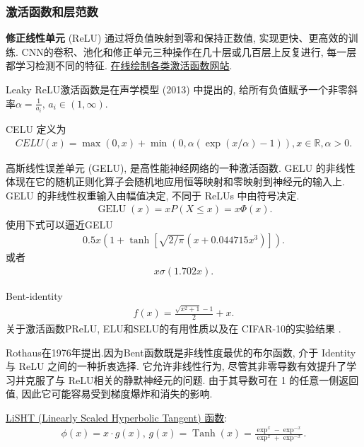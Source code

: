 \subsubsection{激活函数和层范数}
\textbf{修正线性单元} (ReLU) 通过将负值映射到零和保持正数值, 实现更快、更高效的训练.
CNN的卷积、池化和修正单元三种操作在几十层或几百层上反复进行, 每一层都学习检测不同的特征.
\href{https://dashee87.github.io/deep\%20learning/visualising-activation-functions-in-neural-networks/}{在线绘制各类激活函数网站}.
\begin{remark}
Leaky ReLU激活函数是在声学模型 (2013) 中提出的, 给所有负值赋予一个非零斜率$\alpha=\frac 1 {a_i},\, a_i\in (1,\infty)$.
\end{remark}
\begin{remark}
    CELU \cite{hendrycks2016gelu} 定义为
\begin{align}
    CELU (x)=\max (0,x)+\min (0,\alpha (\exp (x/\alpha)-1)), x\in \mathbb R, \alpha> 0.
\end{align}
\end{remark}
\begin{remark}
    高斯线性误差单元 (GELU), 是高性能神经网络的一种激活函数. GELU 的非线性体现在它的随机正则化算子会随机地应用恒等映射和零映射到神经元的输入上.
GELU 的非线性权重输入由幅值决定, 不同于 ReLUs 中由符号决定.
\begin{align}
    \operatorname{GELU} (x)=x P (X \leq x)=x \Phi (x).
\end{align}
使用下式可以逼近GELU
\begin{align}
    0.5 x\left (1+\tanh \left[\sqrt{2 / \pi}\left (x+0.044715 x^{3}\right)\right]\right).
\end{align}
或者
\begin{align}
    x \sigma (1.702 x).
\end{align}
\end{remark}

Bent-identity 
\begin{align}
    f (x) = \frac{\sqrt{x^2 + 1} - 1}{2} +x.
\end{align}
关于激活函数PReLU, ELU和SELU的有用性质以及在 CIFAR-10的实验结果  \cite{Godfrey2019-9846}.

Rothaus在1976年提出.因为Bent函数既是非线性度最优的布尔函数, 介于 Identity 与 ReLU 之间的一种折衷选择.
它允许非线性行为, 尽管其非零导数有效提升了学习并克服了与 ReLU相关的静默神经元的问题.
由于其导数可在 1 的任意一侧返回值, 因此它可能容易受到梯度爆炸和消失的影响.

\href{https://arxiv.org/pdf/1901.05894.pdf}{LiSHT (Linearly Scaled Hyperbolic Tangent) 函数}:
\begin{align}
    \phi (x)=x \cdot g (x),\, g (x)=\operatorname{Tanh} (x)=\frac{\exp ^{x}-\exp ^{-x}}{\exp ^{x}+\exp ^{-x}}.
\end{align}

